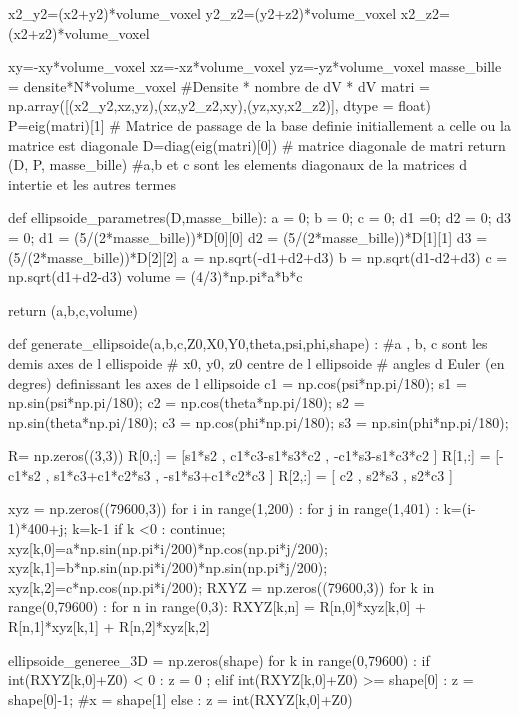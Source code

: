 \begin{customFrame}
    x2_y2=(x2+y2)*volume_voxel        
    y2_z2=(y2+z2)*volume_voxel
    x2_z2=(x2+z2)*volume_voxel
    
    xy=-xy*volume_voxel
    xz=-xz*volume_voxel
    yz=-yz*volume_voxel
    masse_bille = densite*N*volume_voxel #Densite * nombre de dV * dV
    matri = np.array([(x2_y2,xz,yz),(xz,y2_z2,xy),(yz,xy,x2_z2)], dtype = float)
    P=eig(matri)[1] # Matrice de passage de la base definie initiallement a celle ou la matrice est diagonale 
    D=diag(eig(matri)[0]) # matrice diagonale de matri
    return (D, P, masse_bille) #a,b et c sont les elements diagonaux de la matrices d intertie et les autres termes

def ellipsoide_parametres(D,masse_bille):
    a = 0; b = 0; c = 0; d1 =0; d2 = 0; d3 = 0;
    d1 = (5/(2*masse_bille))*D[0][0]
    d2 = (5/(2*masse_bille))*D[1][1]
    d3 = (5/(2*masse_bille))*D[2][2]
    a = np.sqrt(-d1+d2+d3)
    b = np.sqrt(d1-d2+d3)
    c = np.sqrt(d1+d2-d3)
    volume =  (4/3)*np.pi*a*b*c  
    
    return (a,b,c,volume)

def generate_ellipsoide(a,b,c,Z0,X0,Y0,theta,psi,phi,shape) : 
    #a , b, c sont les demis axes de l ellispoide
    # x0, y0, z0 centre de l ellipsoide    
    # angles d Euler (en degres) definissant les axes de l ellipsoide
    c1 = np.cos(psi*np.pi/180);
    s1 = np.sin(psi*np.pi/180);
    c2 = np.cos(theta*np.pi/180);
    s2 = np.sin(theta*np.pi/180);
    c3 = np.cos(phi*np.pi/180);
    s3 = np.sin(phi*np.pi/180);
    
    R= np.zeros((3,3))
    R[0,:] = [s1*s2  , c1*c3-s1*s3*c2 , -c1*s3-s1*c3*c2 ] 
    R[1,:] =  [-c1*s2  , s1*c3+c1*c2*s3 , -s1*s3+c1*c2*c3 ]
    R[2,:] =  [ c2 , s2*s3 , s2*c3 ] 
    
    xyz = np.zeros((79600,3))  
    for i in range(1,200) : 
        for j in range(1,401) : 
            k=(i-1)*400+j;       
            k=k-1
            if k <0 : continue;
            xyz[k,0]=a*np.sin(np.pi*i/200)*np.cos(np.pi*j/200);
            xyz[k,1]=b*np.sin(np.pi*i/200)*np.sin(np.pi*j/200);
            xyz[k,2]=c*np.cos(np.pi*i/200);
    RXYZ = np.zeros((79600,3))
    for k in range(0,79600) : 
        for n in range(0,3): 
            RXYZ[k,n] = R[n,0]*xyz[k,0] + R[n,1]*xyz[k,1] + R[n,2]*xyz[k,2]
    
    ellipsoide_generee_3D = np.zeros(shape)
    for k in range(0,79600) :   
        if int(RXYZ[k,0]+Z0) < 0 : z = 0 ;
        elif int(RXYZ[k,0]+Z0) >= shape[0] : z = shape[0]-1; #x = shape[1]    
        else : z = int(RXYZ[k,0]+Z0)
        

\end{customFrame}
